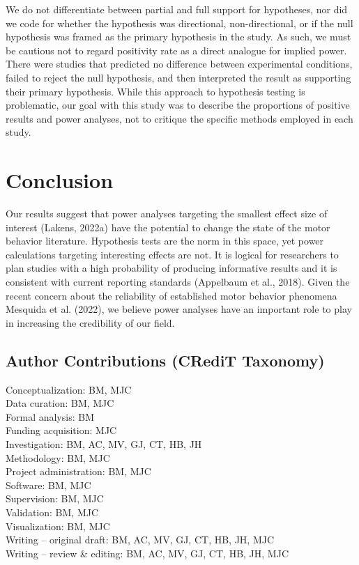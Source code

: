 \documentclass[
  doc, donotrepeattitle,floatsintext]{apa7}
\begin{document}
We do not differentiate between partial and full support for hypotheses, nor did we code for whether the hypothesis was directional, non-directional, or if the null hypothesis was framed as the primary hypothesis in the study. As such, we must be cautious not to regard positivity rate as a direct analogue for implied power. There were studies that predicted no difference between experimental conditions, failed to reject the null hypothesis, and then interpreted the result as supporting their primary hypothesis. While this approach to hypothesis testing is problematic, our goal with this study was to describe the proportions of positive results and power analyses, not to critique the specific methods employed in each study.

\hypertarget{conclusion}{%
\section{Conclusion}\label{conclusion}}

Our results suggest that power analyses targeting the smallest effect size of interest (Lakens, 2022a) have the potential to change the state of the motor behavior literature. Hypothesis tests are the norm in this space, yet power calculations targeting interesting effects are not. It is logical for researchers to plan studies with a high probability of producing informative results and it is consistent with current reporting standards (Appelbaum et al., 2018). Given the recent concern about the reliability of established motor behavior phenomena Mesquida et al. (2022), we believe power analyses have an important role to play in increasing the credibility of our field.

\pagebreak

\hypertarget{author-contributions-credit-taxonomy}{%
\subsection{Author Contributions (CRediT Taxonomy)}\label{author-contributions-credit-taxonomy}}

\noindent Conceptualization: BM, MJC\\
Data curation: BM, MJC\\
Formal analysis: BM\\
Funding acquisition: MJC\\
Investigation: BM, AC, MV, GJ, CT, HB, JH\\
Methodology: BM, MJC\\
Project administration: BM, MJC\\
Software: BM, MJC\\
Supervision: BM, MJC\\
Validation: BM, MJC\\
Visualization: BM, MJC\\
Writing -- original draft: BM, AC, MV, GJ, CT, HB, JH, MJC\\
Writing -- review \& editing: BM, AC, MV, GJ, CT, HB, JH, MJC
\end{document}
